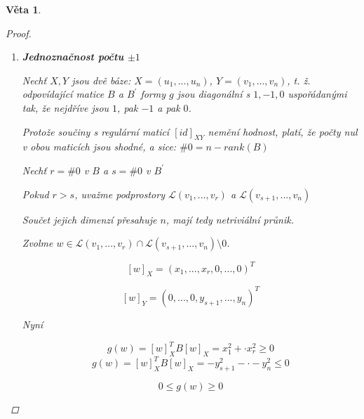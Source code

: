 \documentclass[10pt,a4paper]{article}
\theoremstyle{plain}
\newtheorem{veta}{Věta}
\begin{document}
\begin{enumerate}
\begin{veta}
\begin{proof}
\begin{enumerate}
$B$ je matice formy vzhledem k nějaké bázi $X$.

Reálné symetrické matice lze diagonalizovat.

$B = R^TDR$ pro $R$ regulární.

Nyní $D = S^TD^\prime S$ kde $d_{i,i} \begin{cases} 
= 0 & d^\prime_{i,i} = 0 \quad s_{i,i} = 1 \\
> 0 & d^\prime_{i,i} = 1 \quad s_{i,i} = \sqrt{d_{i,i}} \\
< 0 & d^\prime_{i,i} = -1 \quad s_{i,i} = \sqrt{-d_{i,i}} \end{cases}$

$SR$ je regulární.

\[ B = (SR)^TD^\prime(SR)\]

Zvolíme bázi $Y$: souřadnice vektorů $Y$ vzhledem k $X$ jsou sloupce $SR$.

\[ [id]^T_{XY}B[id]_{XY} = ((SR)^{-1})(SR)^TD^\prime(SR)(SR)^{-1}  = D^\prime\]

\item \textbf{Jednoznačnost počtu $\pm 1$}

Nechť $X,Y$ jsou dvě báze: $X = (u_1, ..., u_n )$, $Y = (v_1, ..., v_n)$, t. ž. odpovídající matice $B$ a $B^\prime$ formy $g$ jsou diagonální s $1, -1, 0$ uspořádanými tak, že nejdříve jsou $1$, pak $-1$ a pak $0$.

Protože součiny s regulární maticí $[id]_{XY}$ nemění hodnost, platí, že počty nul v obou maticích jsou shodné, a sice: $\# 0 = n - rank(B)$

\hfill

Nechť $r = \#0$ v $B$ a $s = \#0$ v $B^\prime$

Pokud $r > s$, uvažme podprostory $\mathcal{L}(v_1, ..., v_r)$ a  $\mathcal{L}(v_{s+1}, ..., v_n)$

Součet jejich dimenzí přesahuje $n$, mají tedy netriviální průnik. 

Zvolme $w \in \mathcal{L}(v_1, ..., v_r) \cap \mathcal{L}(v_{s+1}, ..., v_n) \setminus 0$.

\[[w]_X = (x_1, ..., x_r, 0, ..., 0)^T\]

\[[w]_Y = ( 0, ..., 0, y_{s+1}, ..., y_n)^T\]

\hfill

Nyní

\[ g(w) = [w]_X^TB[w]_X = x_1^2 + \cdot x_r^2 \geq 0 \]
\[ g(w) = [w]_X^TB[w]_X = -y_{s+1}^2 - \cdot -y_n^2 \leq 0 \]

\hfill

\[ 0 \leq g(w) \geq 0 \]


\end{enumerate}
\end{proof}
\end{veta}
\end{enumerate}
\end{document}
